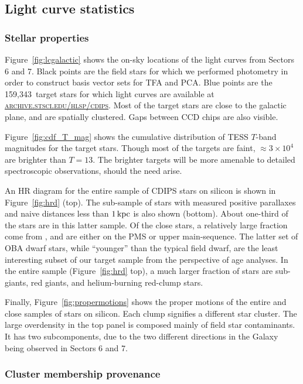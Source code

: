 \documentclass[12pt,twocolumn,tighten,trackchanges]{aastex62}
\newcommand{\numberlcs}{159{,}343\ } %
\newcommand{\stscilink}{\textsc{\url{archive.stsci.edu/hlsp/cdips}}}
\begin{document}
\subsection{Light curve statistics}
\label{subsec:lcstatistics}

\subsubsection{Stellar properties}

Figure~\ref{fig:lcgalactic} shows the on-sky locations of the light
curves from Sectors 6 and 7.  Black points are the field stars for
which we performed photometry in order to construct basis vector sets
for TFA and PCA.  Blue points are the \numberlcs target stars for
which light curves are available at \stscilink.  Most of the target
stars are close to the galactic plane, and are spatially clustered.
Gaps between CCD chips are also visible.

Figure~\ref{fig:cdf_T_mag} shows the cumulative distribution of TESS
$T$-band magnitudes for the target stars.  Though most of the targets
are faint, $\approx3\times10^4$ are brighter than $T=13$. The brighter
targets will be more amenable to detailed spectroscopic observations,
should the need arise.

An HR diagram for the entire sample of CDIPS stars on silicon is shown
in Figure~\ref{fig:hrd} (top).  The sub-sample of stars with measured
positive parallaxes and naive distances less than $1\,{\rm kpc}$ is
also shown (bottom).  About one-third of the stars are in this latter
sample.  Of the close stars, a relatively large fraction come from
\citet{zari_3d_2018}, and are either on the PMS or upper
main-sequence.  The latter set of OBA dwarf stars, while ``younger''
than the typical field dwarf, are the least interesting subset of our
target sample from the perspective of age analyses.  In the entire
sample (Figure~\ref{fig:hrd} top), a much larger fraction of stars are
sub-giants, red giants, and helium-burning red-clump stars.

Finally, Figure~\ref{fig:propermotions} shows the proper motions of
the entire and close samples of stars on silicon.  Each clump
signifies a different star cluster. The large overdensity in the top
panel is composed mainly of field star contaminants. It has two
subcomponents, due to the two different directions in the Galaxy being
observed in Sectors 6 and 7.


\subsubsection{Cluster membership provenance}
\end{document}
